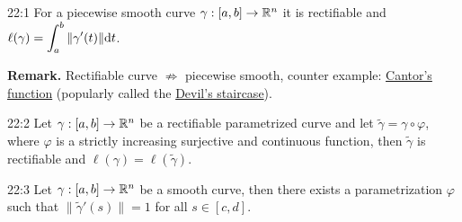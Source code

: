 \documentclass[../Analysis-3.tex]{subfiles}
\begin{document}
\begin{Thm}{}{22:1}
  For a piecewise smooth curve $\gamma : [a,b] \to \mathbb{R}^n$ it is rectifiable and $\ell(\gamma) = \displaystyle\int_a^b \norm{\gamma'(t)} \dd t $.
\end{Thm}

\textbf{Remark.} Rectifiable curve $\not\Rightarrow$ piecewise smooth, counter example: \href{https://en.wikipedia.org/wiki/Cantor_function}{Cantor's function} (popularly called the \href{https://mathweb.ucsd.edu/~bseward/140b_spring20/Devils-Staircase.pdf}{Devil's staircase}).

\begin{Thm}{}{22:2}
  Let $\gamma : [a,b] \to \mathbb{R}^n$ be a rectifiable parametrized curve and let $\tilde{\gamma} = \gamma \circ \varphi$, where $\varphi$ is a strictly increasing surjective and continuous function, then $\tilde{\gamma}$ is rectifiable and $\ell(\gamma) = \ell(\tilde{\gamma})$.
\end{Thm}

\begin{Thm}{}{22:3}
  Let $\gamma : [a,b] \to \mathbb{R}^n$ be a smooth curve, then there exists a parametrization $\varphi$ such that $\| \tilde{\gamma}'(s) \| = 1$ for all $s \in [c,d]$.
\end{Thm}
\end{document}
